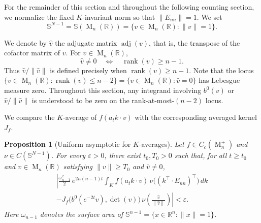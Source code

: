 \documentclass[reqno,11pt]{amsart}
\numberwithin{equation}{section}
\newtheorem{proposition}[theorem]{Proposition}
\theoremstyle{definition}
\theoremstyle{remark}
\newcommand{\op}{\operatorname}
\newcommand{\rank}{\op{rank}}
\newcommand{\R}{\mathbb R}
\newcommand{\e}{\varepsilon}
\newcommand{\M}{\op{M}}
\begin{document}
For the remainder of this section and throughout the following counting section,
we normalize the fixed $K$-invariant norm so that
$
\|E_{nn}\|=1.
$
We set
$$
\mathbb S^{N-1}
=
\mathbb S(\M_n(\mathbb R))
=
\{v\in\M_n(\mathbb R):\|v\|=1\}.
$$

We denote by
$\widehat v$ the adjugate matrix $\operatorname{adj}(v)$, that is, the
transpose of the cofactor matrix of $v$. For $v\in\M_n(\R)$,
$$
\widehat v\ne0
\quad\Longleftrightarrow\quad
\rank(v)\ge n-1.
$$
Thus $\widehat v/\|\widehat v\|$ is defined precisely when
$\rank(v)\ge n-1$.
 Note that the locus $\{v\in\M_n(\mathbb R):\operatorname{rank}(v)\le n-2\}
=
\{v \in \M_n(\mathbb R):\widehat v=0\}$ has Lebesgue measure zero. Throughout this section, any integrand
involving $b^0(v)$ or
$\widehat v/\|\widehat v\|$ is understood to be zero on the rank-at-most-$(n-2)$ locus. 


We compare the $K$-average of $f(a_tk\cdot v)$ with the
corresponding averaged kernel $J_f$.
\begin{proposition}[Uniform asymptotic for $K$-averages]\label{jf}
Let $f\in C_c(\M_n^+)$ and
$\nu\in C(\mathbb S^{N-1})$. For every $\varepsilon>0$, there exist $t_0,T_0>0$ such that, for all $t\ge t_0$ and
$v\in\M_n(\mathbb R)$ satisfying $\|v\|\ge T_0$ and $\widehat v\ne0$,
\begin{multline*}
\left|
\frac{{\omega}_{n-1}^2}{2} \, e^{2n(n-1)t}
\int_K f(a_t k \cdot v)\,
\nu\bigl((k^{\intercal} \cdot E_{nn})^{\intercal}\bigr)\, dk \right. \\
\left.
- J_f\bigl( b^0(e^{-2t}v), \det(v)\bigr)\,
\nu\!\left(\frac{\widehat v}{\|\widehat v\|}\right)
\right| < \e.
\end{multline*}
Here $\omega_{n-1}$ denotes the surface area of 
$\mathbb S^{n-1}=\{x\in\mathbb R^n:\|x\|=1\}$.
\end{proposition}
\end{document}
